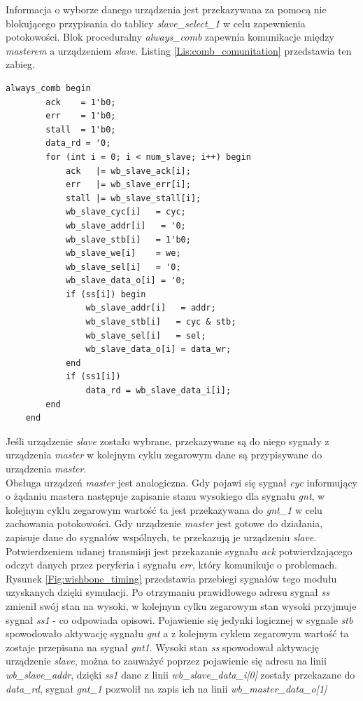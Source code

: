 \documentclass[11pt,a4paper]{article}
\begin{document}
Informacja o wyborze danego urządzenia jest przekazywana za pomocą nie blokującego przypisania do tablicy \textit{slave\_select\_1} w celu zapewnienia potokowości. Blok proceduralny \textit{always\_comb} zapewnia komunikacje między \textit{masterem} a urządzeniem \textit{slave}. Listing \ref{Lis:comb_comunitation} przedstawia ten zabieg.  \\
\begin{minipage}{\textwidth}
\begin{scriptsize}
\begin{lstlisting}[label=Lis:comb_comunitation,caption=Komunikacja urządzenia \textit{master} z urządzeniem \textit{slave}]
	always_comb begin
		ack    = 1'b0;
		err    = 1'b0;
		stall  = 1'b0;
		data_rd = '0;
		for (int i = 0; i < num_slave; i++) begin
			ack   |= wb_slave_ack[i];
			err   |= wb_slave_err[i];
			stall |= wb_slave_stall[i];
			wb_slave_cyc[i]   = cyc;
			wb_slave_addr[i]   = '0;
			wb_slave_stb[i]   = 1'b0;
			wb_slave_we[i]    = we;
			wb_slave_sel[i]   = '0;
			wb_slave_data_o[i] = '0;
			if (ss[i]) begin
				wb_slave_addr[i]   = addr;
				wb_slave_stb[i]   = cyc & stb;
				wb_slave_sel[i]   = sel;
				wb_slave_data_o[i] = data_wr;
			end
			if (ss1[i])
				data_rd = wb_slave_data_i[i];
		end
	end
\end{lstlisting}
\end{scriptsize}
\end{minipage}
Jeśli urządzenie \textit{slave} zostało wybrane, przekazywane są do niego sygnały z urządzenia \textit{master} w kolejnym cyklu zegarowym dane są przypisywane do urządzenia \textit{master}.\\
Obsługa urządzeń \textit{master} jest analogiczna. Gdy pojawi się sygnał \textit{cyc} informujący o żądaniu mastera następuje zapisanie stanu wysokiego dla sygnału \textit{gnt}, w kolejnym cyklu zegarowym wartość ta jest przekazywana do \textit{gnt\_1} w celu zachowania potokowości. Gdy urządzenie \textit{master} jest gotowe do działania, zapisuje dane do sygnałów wspólnych, te przekazują je urządzeniu \textit{slave}. Potwierdzeniem udanej transmisji jest przekazanie sygnału \textit{ack} potwierdzającego odczyt danych przez peryferia i sygnału \textit{err}, który komunikuje o problemach.\\ Rysunek \ref{Fig:wishbone_timing} przedstawia przebiegi sygnałów tego modułu uzyskanych dzięki symulacji. Po otrzymaniu prawidłowego adresu sygnał \textit{ss} zmienił swój stan na wysoki, w kolejnym cylku zegarowym stan wysoki przyjmuje sygnał \textit{ss1} - co odpowiada opisowi. Pojawienie się jedynki logicznej w sygnale \textit{stb} spowodowało aktywację sygnału \textit{gnt} a z kolejnym cyklem zegarowym wartość ta zostaje przepisana na sygnał \textit{gnt1}. Wysoki stan \textit{ss} spowodował aktywację urządzenie \textit{slave}, można to zauważyć poprzez pojawienie się adresu na linii \textit{wb\_slave\_addr}, dzięki \textit{ss1} dane z linii \textit{wb\_slave\_data\_i[0]} zostały przekazane do \textit{data\_rd}, sygnał \textit{gnt\_1} pozwolił na zapis ich na linii \textit{wb\_master\_data\_o[1]} \\
\end{document}
